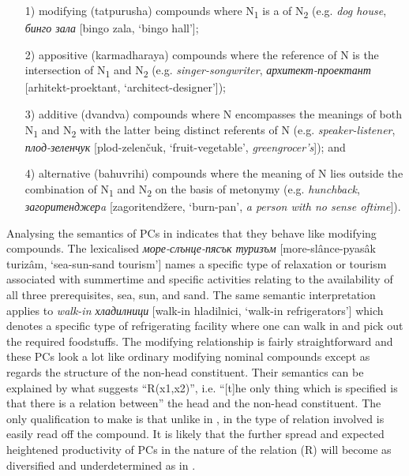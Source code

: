 \documentclass[output=paper]{LSP/langsci}
\begin{document}
\begin{itemize}
\item[1)] modifying (tatpurusha) compounds where N\textsubscript{1} is a  of N\textsubscript{2} (e.g. \textit{dog house}, \textit{{бинго зала} }[bingo zala, `bingo hall']; 
\item[2)] appositive (karmadharaya) compounds where the reference of N is the intersection of N\textsubscript{1} and N\textsubscript{2} (e.g. \textit{singer-songwriter}, \textit{{архитект-проектант} }[arhitekt-proektant, ‘architect-designer’]); 
\item[3)] additive (dvandva) compounds where N encompasses the meanings of both N\textsubscript{1} and N\textsubscript{2} with the latter being distinct referents of N (e.g. \textit{speaker-listener}, \textit{{плод-зеленчук} }[plod-zelenčuk, ‘fruit-vegetable’, \textit{greengrocer's}]); and 
\item[4)] alternative (bahuvrihi) compounds where the meaning of N lies outside the combination of N\textsubscript{1} and N\textsubscript{2} on the basis of metonymy (e.g. \textit{hunchback},  \textit{{загоритенджерa}} [zagoritendžere, ‘burn-pan’, \textit{a person with no sense of\linebreak time}]). 
\end{itemize}

Analysing the semantics of PCs in  indicates that they behave like modifying compounds. The lexicalised \textit{{море-слънце-пясък туризъм} }[more-slân\-ce-pyasâk turizâm, ‘sea-sun-sand tourism’] names a specific type of relaxation or tourism associated with summertime and specific activities relating to the availability of all three prerequisites, sea, sun, and sand. The same semantic interpretation applies to \textit{walk-in {хладилници}} [walk-in hladilnici, ‘walk-in refrigerators’] which denotes a specific type of refrigerating facility where one can walk in and pick out the required foodstuffs. The modifying relationship is fairly straightforward and these PCs look a lot like ordinary modifying nominal compounds except as regards the structure of the non-head constituent. Their semantics can be explained by what \citet[171]{Trips2016} suggests “R(x1,x2)”, i.e.  “[t]he only thing which is specified is that there is a relation between” the head and the non-head constituent. The only qualification to make is that unlike in , in  the type of relation involved is easily read off the compound. It is likely that the further spread and expected heightened productivity of PCs in  the nature of the relation (R) will become as diversified and underdetermined as in .
\end{document}
